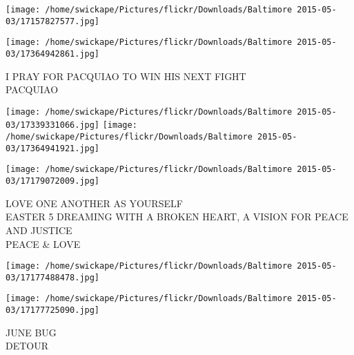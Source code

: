 \documentclass[10pt,letterpaper]{article}
\begin{document}
\texttt{[image: /home/swickape/Pictures/flickr/Downloads/Baltimore 2015-05-03/17157827577.jpg]}

\vspace{0.25in}
\texttt{[image: /home/swickape/Pictures/flickr/Downloads/Baltimore 2015-05-03/17364942861.jpg]}

I PRAY FOR PACQUIAO TO WIN HIS NEXT FIGHT\\
PACQUIAO\\
\pagebreak

\texttt{[image: /home/swickape/Pictures/flickr/Downloads/Baltimore 2015-05-03/17339331066.jpg]}
\texttt{[image: /home/swickape/Pictures/flickr/Downloads/Baltimore 2015-05-03/17364941921.jpg]}

\texttt{[image: /home/swickape/Pictures/flickr/Downloads/Baltimore 2015-05-03/17179072009.jpg]}

LOVE ONE ANOTHER AS YOURSELF\\
EASTER 5 DREAMING WITH A BROKEN HEART, A VISION FOR PEACE AND JUSTICE\\
PEACE \& LOVE\\
\pagebreak

\texttt{[image: /home/swickape/Pictures/flickr/Downloads/Baltimore 2015-05-03/17177488478.jpg]}

\vspace{0.25in}
\texttt{[image: /home/swickape/Pictures/flickr/Downloads/Baltimore 2015-05-03/17177725090.jpg]}

JUNE BUG\\
DETOUR\\
\pagebreak
\end{document}
